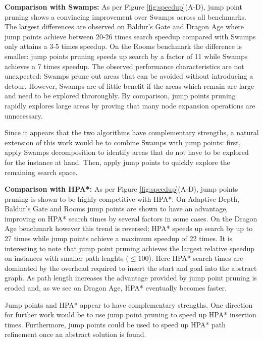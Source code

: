 \textbf{Comparison with Swamps: }
As per Figure \ref{fig:speedup}(A-D), jump point pruning shows a convincing
improvement over Swamps across all benchmarks. 
The largest differences are observed on Baldur's Gate and Dragon Age where jump 
points achieve between 20-26 times search speedup compared with Swamps
only attains a 3-5 times speedup.
On the Rooms benchmark the difference is smaller: jump points pruning
speeds up search by a factor of 11 while Swamps achieves a 7 times
speedup.
The observed performance characteristics are not unexpected: Swamps prune out
areas that can be avoided without introducing a detour. However, Swamps are of
little benefit if the areas which remain are large and need to be explored 
throroughly.
By comparison, jump points pruning rapidly explores large areas by proving
that many node expansion operations are unnecessary.
\par
Since it appears that the two algorithms have complementary strengths, a natural
extension of this work would be to combine Swamps with jump points:
first, apply Swamps decomposition to identify areas that do not have to be
explored for the instance at hand. Then, apply jump points to quickly explore the
remaining search space.
\par
\textbf{Comparison with HPA*: }
As per Figure \ref{fig:speedup}(A-D), jump points pruning is shown to be 
highly competitive with HPA*.
On Adaptive Depth, Baldur's Gate and Rooms jump points are shown to have an 
advantage, improving on HPA* search times by several factors in some cases.
On the Dragon Age benchmark however this trend is reversed; HPA* speeds up
search by up to 27 times while jump points achieve a maximum speedup of 22
times.
It is interesting to note that jump point pruning achieves the largest relative
speedup on instances with smaller path lenghts
($\leq 100$). Here HPA* search times are dominated by the overhead required to
insert the start and goal into the abstract graph.
As path length increases the advantage provided by jump point pruning is eroded
and, as we see on Dragon Age, HPA* eventually becomes faster.
\par
Jump points and HPA* appear to have complementary strengths.
One direction for further work would be to use jump point pruning to speed up
HPA* insertion times. Furthermore,  jump points could be used to speed up 
HPA* path refinement once an abstract solution is found.
